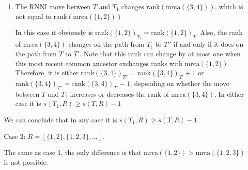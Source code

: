 \documentclass{amsart}
\newcommand{\rnni}{\mathrm{RNNI}}
\newcommand{\mrca}{\mathrm{mrca}}
\newcommand{\rank}{\mathrm{rank}}
\begin{document}
\begin{enumerate}
    \item The $\rnni$ move between $T$ and $T_1$ changes $\rank(\mrca(\{3,4\}))$, which is not equal to $\rank(\mrca(\{1,2\}))$

    In this case it obviously is $\rank(\{1,2\})_{T_1} = \rank(\{1,2\})_{T}$.
    Also, the rank of $\mrca(\{3,4\})$ changes on the path from $T_1$ to $T''$ if and only if it does on the path from $T$ to $T'$.
    Note that this rank can change by at most one when this most recent common ancestor exchanges ranks with $\mrca(\{1,2\})$.
    Therefore, it is either $\rank(\{3,4\})_{T''} = \rank(\{3,4\})_{T'} + 1$ or $\rank(\{3,4\})_{T''} = \rank(\{3,4\})_{T'} - 1$, depending on whether the move between $T$ and $T_1$ increases or decreases the rank of $\mrca(\{3,4\})$.
    In either case it is $s(T_1,R) \geq s(T,R) - 1$
\end{enumerate}

We can conclude that in any case it is $s(T_1,R) \geq s(T,R) - 1$.


Case 2: $R = [\{1, 2\}, \{1, 2, 3\}, \ldots]$.

The same as case 1, the only difference is that $\mrca(\{1,2\}) > \mrca(\{1,2,3\})$ is not possible.
\endproof
\end{document}
